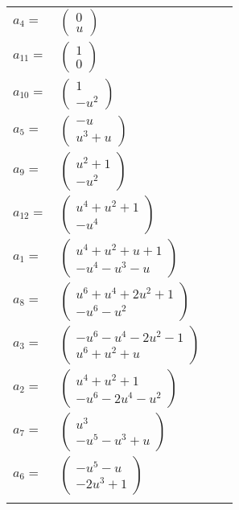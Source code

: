 \documentclass[1p]{elsarticle_modified}
\theoremstyle{definition}
\begin{document}
\begin{tabular}{m{7pt} m{180pt} m{7pt} m{180pt} }
\flushright $a_{4}=$&$\begin{pmatrix}0\\u\end{pmatrix}$ \\
\flushright $a_{11}=$&$\begin{pmatrix}1\\0\end{pmatrix}$ \\
\flushright $a_{10}=$&$\begin{pmatrix}1\\- u^2\end{pmatrix}$ \\
\flushright $a_{5}=$&$\begin{pmatrix}- u\\u^3+u\end{pmatrix}$ \\
\flushright $a_{9}=$&$\begin{pmatrix}u^2+1\\- u^2\end{pmatrix}$ \\
\flushright $a_{12}=$&$\begin{pmatrix}u^4+u^2+1\\- u^4\end{pmatrix}$ \\
\flushright $a_{1}=$&$\begin{pmatrix}u^4+u^2+u+1\\- u^4- u^3- u\end{pmatrix}$ \\
\flushright $a_{8}=$&$\begin{pmatrix}u^6+u^4+2 u^2+1\\- u^6- u^2\end{pmatrix}$ \\
\flushright $a_{3}=$&$\begin{pmatrix}- u^6- u^4-2 u^2-1\\u^6+u^2+u\end{pmatrix}$ \\
\flushright $a_{2}=$&$\begin{pmatrix}u^4+u^2+1\\- u^6-2 u^4- u^2\end{pmatrix}$ \\
\flushright $a_{7}=$&$\begin{pmatrix}u^3\\- u^5- u^3+u\end{pmatrix}$ \\
\flushright $a_{6}=$&$\begin{pmatrix}- u^5- u\\-2 u^3+1\end{pmatrix}$\\&\end{tabular}
\end{document}
